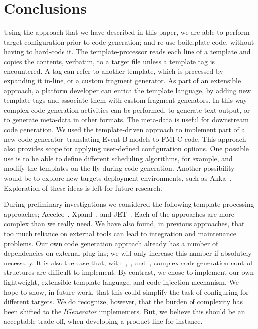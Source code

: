 \documentclass{llncs}%
\begin{document}
%
\section{Conclusions}\label{conc}
Using the approach that we have described in this paper, we are able to perform target configuration prior to code-generation; and re-use boilerplate code, without having to hard-code it. The template-processor reads each line of a template and copies the contents, verbatim, to a target file unless a template tag is encountered. A tag can refer to another template, which is processed by expanding it in-line, or a custom fragment generator. As part of an extensible approach, a platform developer can enrich the template language, by adding new template tags and associate them with custom fragment-generators. In this way complex code generation activities can be performed, to generate text output, or  to generate meta-data in other formats. The meta-data is useful for downstream code generation. We used the template-driven approach to implement part of a new code generator, translating Event-B models to FMI-C code. This approach also provides scope for applying user-defined configuration options. One possible use is to be able to define different scheduling algorithms, for example, and modify the templates on-the-fly during code generation. Another possibility would be to explore new targets deployment environments, such as Akka~\cite{akka}.
 Exploration of these ideas is left for future research.  

During preliminary investigations we considered the following template processing approaches; Acceleo~\cite{acceleo}, Xpand~\cite{xpand}, and JET~\cite{JET}. Each of the approaches are more complex than we really need. We have also found, in previous approaches, that too much reliance on external tools can lead to integration and maintenance problems. Our own code generation approach already has a number of dependencies on external plug-ins; we will only increase this number if absolutely necessary. It is also the case that, with~\cite{acceleo},~\cite{xpand}, and~\cite{JET}, complex code generation control structures are difficult to implement. By contrast, we chose to implement our own lightweight, extensible template language, and code-injection mechanism. We hope to show, in future work, that this could simplify the task of configuring for different targets. We do recognize, however, that the burden of complexity has been shifted to the \emph{IGenerator} implementers. But, we believe this should be an acceptable trade-off, when developing a product-line for instance. 
%


%
%
%
\end{document}
